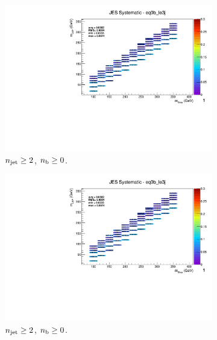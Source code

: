 \begin{figure}[ht!]
  \centering
  \begin{subfigure}[b]{0.32\textwidth}
    \includegraphics[width=\textwidth, page=14]
    {Figs/sms/t2cc/v37_3/systs/T2cc_JES_eq0b_le3j.pdf}
    \caption{$n_{\text{jet}} \geq 2$, $n_{\text{b}} \geq 0$.}
  \end{subfigure}
  \begin{subfigure}[b]{0.32\textwidth}
    \includegraphics[width=\textwidth, page=9]
    {Figs/sms/t2cc/v37_3/systs/T2cc_JES_eq0b_le3j.pdf}
    \caption{$n_{\text{jet}} \geq 2$, $n_{\text{b}} \geq 0$.}
  \end{subfigure}
  \begin{subfigure}[b]{0.32\textwidth}

\end{subfigure}
\end{figure}
